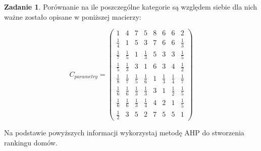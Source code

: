 \documentclass{article}[UTF8]
\theoremstyle{definition}
\newtheorem{zad}{Zadanie}
\begin{document}
\begin{zad}
Porównanie na ile poszczególne kategorie są względem siebie dla nich ważne zostało opisane w poniższej macierzy:

$$C_{parametry}=\begin{pmatrix}
1&4&7&5&8&6&6&2\\
\frac{1}{4}&1&5&3&7&6&6&\frac{1}{3}\\
\frac{1}{7}&\frac{1}{5}&1&\frac{1}{3}&5&3&3&\frac{1}{5}\\
\frac{1}{5}&\frac{1}{3}&3&1&6&3&4&\frac{1}{2}\\
\frac{1}{8}&\frac{1}{7}&\frac{1}{5}&\frac{1}{6}&1&\frac{1}{3}&\frac{1}{4}&\frac{1}{7}\\
\frac{1}{6}&\frac{1}{6}&\frac{1}{3}&\frac{1}{3}&3&1&\frac{1}{2}&\frac{1}{5}\\
\frac{1}{6}&\frac{1}{6}&\frac{1}{3}&\frac{1}{4}&4&2&1&\frac{1}{5}\\
\frac{1}{2}&3&5&2&7&5&5&1
\end{pmatrix}
$$
\end{zad}

Na podstawie powyższych informacji wykorzystaj metodę AHP do stworzenia rankingu domów. 
\newpage
\end{document}
